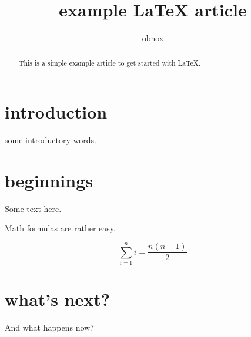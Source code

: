 \documentclass{article}
\title{example {\LaTeX} article}
\author{obnox}
\begin{document}
\maketitle
\begin{abstract}

    This is a simple  example article to get started with  {\LaTeX}.

\end{abstract}

\tableofcontents


\section{introduction}

some introductory words.

\section{beginnings}



Some text here.


Math formulas are rather easy.


\[ \sum_{i=1}^{n}i = \frac{n(n+1)}{2} \]

\section{what's next?}

And what happens now?
\end{document}
